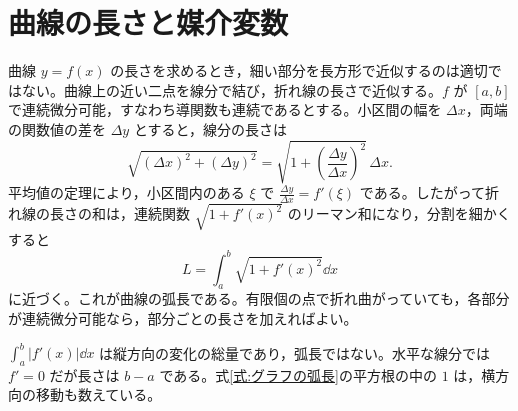 \section{曲線の長さと媒介変数}\label{節:曲線の弧長}

曲線 $y=f(x)$ の長さを求めるとき，細い部分を長方形で近似するのは適切ではない。曲線上の近い二点を線分で結び，折れ線の長さで近似する。$f$ が $[a,b]$ で連続微分可能，すなわち導関数も連続であるとする。小区間の幅を $\Delta x$，両端の関数値の差を $\Delta y$ とすると，線分の長さは
\[
\sqrt{(\Delta x)^2+(\Delta y)^2}
 =\sqrt{1+\left(\frac{\Delta y}{\Delta x}\right)^2}\,\Delta x.
\]
平均値の定理により，小区間内のある $\xi$ で $\frac{\Delta y}{\Delta x}=f'(\xi)$ である。したがって折れ線の長さの和は，連続関数 $\sqrt{1+f'(x)^2}$ のリーマン和になり，分割を細かくすると
\begin{equation}\label{式:グラフの弧長}
L=\int_a^b\sqrt{1+f'(x)^2}\dd x
\end{equation}
に近づく。これが曲線の弧長である。有限個の点で折れ曲がっていても，各部分が連続微分可能なら，部分ごとの長さを加えればよい。

$\int_a^b|f'(x)|\dd x$ は縦方向の変化の総量であり，弧長ではない。水平な線分では $f'=0$ だが長さは $b-a$ である。式\eqref{式:グラフの弧長}の平方根の中の $1$ は，横方向の移動も数えている。

%
